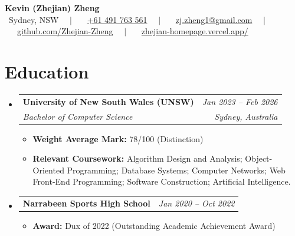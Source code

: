 \documentclass[10pt, a4paper]{article}
\makeatletter
\newcommand{\resumeSubheading}[4]{
  \vspace{-1pt}\item
    \begin{tabular*}{0.97\textwidth}[t]{l@{\extracolsep{\fill}}r}
      \textbf{#1} & \textit{\small #2} \\
      \textit{\small #3} & \textit{\small #4} \\
    \end{tabular*}\vspace{-5pt}
}
\newcommand{\resumeSubheadingOneLine}[2]{
  \item
  \begin{tabular*}{0.97\textwidth}[t]{l@{\extracolsep{\fill}}r}
    \textbf{#1} & \textit{\small #2} \\
  \end{tabular*}\vspace{-6pt}
}
\newenvironment{resumeItemList}{\begin{itemize}[leftmargin=0.15in, label={}]}{\end{itemize}}
\makeatother
\begin{document}
\begin{center}
    {\Large \color{darkblue} \textbf{Kevin (Zhejian) Zheng}} \\ \vspace{4pt}
    \small
    \faMapMarker* \ Sydney, NSW \ \ $|$ \ \ 
    \faPhone \ \href{tel:+61491763561}{+61 491 763 561} \ \ $|$ \ \ 
    \faEnvelope \ \href{mailto:zj.zheng1@gmail.com}{zj.zheng1@gmail.com} \ \ $|$ \ \ 
    \faGithub \ \href{https://github.com/Zhejian-Zheng}{github.com/Zhejian-Zheng} \ \ $|$ \ \ 
    \faLink \ \href{https://zhejian-homepage.vercel.app/}{zhejian-homepage.vercel.app/}
\end{center}

\section{Education}
\begin{resumeItemList}

  \resumeSubheading
    {University of New South Wales (UNSW)}{Jan 2023 -- Feb 2026}
    {Bachelor of Computer Science}{Sydney, Australia}
    \begin{itemize}[leftmargin=0.15in, label={}, itemsep=1pt, topsep=2pt]
      \item \small \textbf{Weight Average Mark:} 78/100 (Distinction)
      \item \small \textbf{Relevant Coursework:} Algorithm Design and Analysis; Object-Oriented Programming; Database Systems; Computer Networks; Web Front-End Programming; Software Construction; Artificial Intelligence.
    \end{itemize}

  \resumeSubheadingOneLine
    {Narrabeen Sports High School}{Jan 2020 -- Oct 2022}
    \begin{itemize}[leftmargin=0.15in, label={}, itemsep=1pt, topsep=2pt]
      \item \small \textbf{Award:} Dux of 2022 (Outstanding Academic Achievement Award)
    \end{itemize}

\end{resumeItemList}


\end{document}

